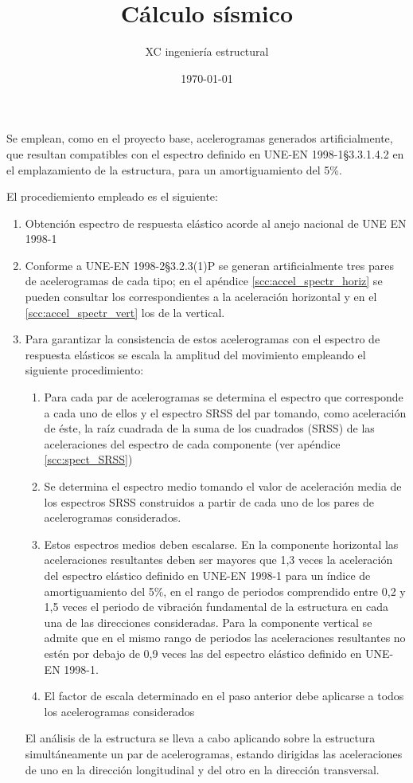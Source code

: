 \documentclass[spanish, a4paper,twoside]{xc_report}
\author{XC ingeniería estructural}
\date{\today}
\title{Cálculo sísmico}
\begin{document}
\newenvironment{Figure}
  {\par\medskip\noindent\minipage{\linewidth}}
  {\endminipage\par\medskip}
  
Se emplean, como en el proyecto base, acelerogramas generados artificialmente, que resultan compatibles con el espectro definido en UNE-EN 1998-1\S3.3.1.4.2 en el emplazamiento de la estructura, para un amortiguamiento del 5\%.

El procediemiento empleado es el siguiente:
\begin{enumerate}
\item Obtención espectro de respuesta elástico acorde al anejo nacional de UNE EN 1998-1
\item Conforme a UNE-EN 1998-2\S3.2.3(1)P se generan artificialmente tres pares de acelerogramas de cada tipo; en el apéndice \ref{scc:accel_spectr_horiz} se pueden consultar los correspondientes a la aceleración horizontal y en el \ref{scc:accel_spectr_vert} los de la vertical.
\item Para garantizar la consistencia de estos acelerogramas con el espectro de respuesta elásticos se escala la amplitud del movimiento empleando el siguiente procedimiento:
  \begin{enumerate}
    \item Para cada par de acelerogramas se determina el espectro que corresponde a cada uno de ellos y el espectro SRSS del par tomando, como aceleración de éste, la raíz cuadrada de la suma de los cuadrados (SRSS) de las aceleraciones del espectro de cada componente (ver apéndice \ref{scc:spect_SRSS})
    \item Se determina el espectro medio tomando el valor de aceleración media de los espectros SRSS construidos a partir de cada uno de los pares de acelerogramas considerados.
    \item Estos espectros medios deben escalarse. En la componente horizontal las aceleraciones resultantes deben ser mayores que 1,3 veces la aceleración del espectro elástico definido en UNE-EN 1998-1 para un índice de amortiguamiento del 5\%, en el rango de periodos comprendido entre 0,2 y 1,5 veces el periodo de vibración fundamental de la estructura en cada una de las direcciones consideradas. Para la componente vertical se admite que en el mismo rango de periodos las aceleraciones resultantes no estén por debajo de 0,9 veces las del espectro elástico definido en UNE-EN 1998-1.
      \item El factor de escala determinado en el paso anterior debe aplicarse a todos los acelerogramas considerados
  \end{enumerate}
  El análisis de la estructura se lleva a cabo aplicando sobre la estructura simultáneamente un par de acelerogramas, estando dirigidas las aceleraciones de uno en la dirección longitudinal y del otro en la dirección transversal.
\end{enumerate}
\end{document}
